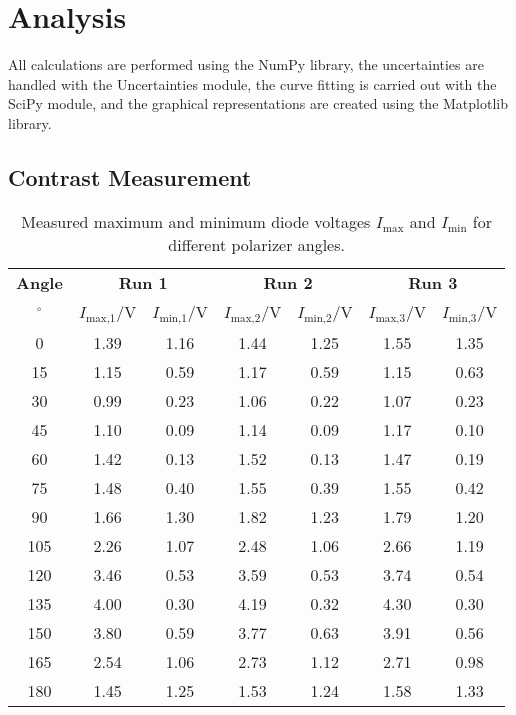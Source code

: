 \section{Analysis}
\label{sec:Auswertung}

All calculations are performed using the NumPy \cite{numpy} library, the uncertainties are handled with the Uncertainties \cite{uncertainties} module, 
the curve fitting is carried out with the SciPy \cite{scipy} module, and the graphical representations are created using the Matplotlib \cite{matplotlib} 
library.

\subsection{Contrast Measurement}

\begin{table}[h!]
    \centering
    \caption{Measured maximum and minimum diode voltages $I_{\text{max}}$ and $I_{\text{min}}$ for different polarizer angles.}
    \label{tab:contrast_measurement}
    \begin{tabular}{c|cc|cc|cc}
    \toprule
    \textbf{Angle} & \multicolumn{2}{c|}{\textbf{Run 1}} & \multicolumn{2}{c|}{\textbf{Run 2}} & \multicolumn{2}{c}{\textbf{Run 3}} \\
    $^{\circ}$ & $I_{\text{max,1}}$/V & $I_{\text{min,1}}$/V & $I_{\text{max,2}}$/V & $I_{\text{min,2}}$/V & $I_{\text{max,3}}$/V & $I_{\text{min,3}}$/V \\
    \midrule
    0   & 1.39 & 1.16 & 1.44 & 1.25 & 1.55 & 1.35 \\
    15  & 1.15 & 0.59 & 1.17 & 0.59 & 1.15 & 0.63 \\
    30  & 0.99 & 0.23 & 1.06 & 0.22 & 1.07 & 0.23 \\
    45  & 1.10 & 0.09 & 1.14 & 0.09 & 1.17 & 0.10 \\
    60  & 1.42 & 0.13 & 1.52 & 0.13 & 1.47 & 0.19 \\
    75  & 1.48 & 0.40 & 1.55 & 0.39 & 1.55 & 0.42 \\
    90  & 1.66 & 1.30 & 1.82 & 1.23 & 1.79 & 1.20 \\
    105 & 2.26 & 1.07 & 2.48 & 1.06 & 2.66 & 1.19 \\
    120 & 3.46 & 0.53 & 3.59 & 0.53 & 3.74 & 0.54 \\
    135 & 4.00 & 0.30 & 4.19 & 0.32 & 4.30 & 0.30 \\
    150 & 3.80 & 0.59 & 3.77 & 0.63 & 3.91 & 0.56 \\
    165 & 2.54 & 1.06 & 2.73 & 1.12 & 2.71 & 0.98 \\
    180 & 1.45 & 1.25 & 1.53 & 1.24 & 1.58 & 1.33 \\
    \bottomrule
    \end{tabular}
    \end{table}
    